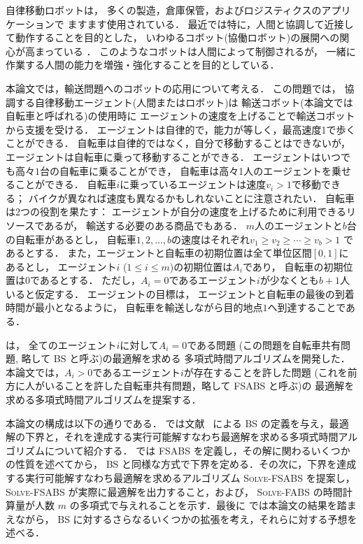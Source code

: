 
自律移動ロボットは，
多くの製造，倉庫保管，およびロジスティクスのアプリケーションで
ますます使用されている．
最近では特に，人間と協調して近接して動作することを目的とした，
いわゆるコボット(協働ロボット)の展開への関心が高まっている \cite{4154820,wiki,6386300}．
このようなコボットは人間によって制御されるが，
一緒に作業する人間の能力を増強・強化することを目的としている．

本論文では，輸送問題へのコボットの応用について考える．
この問題では，
協調する自律移動エージェント(人間またはロボット)は
輸送コボット(本論文では自転車と呼ばれる)の使用時に
エージェントの速度を上げることで輸送コボットから支援を受ける．
エージェントは自律的で，能力が等しく，最高速度1で歩くことができる．
自転車は自律的ではなく，自分で移動することはできないが，
エージェントは自転車に乗って移動することができる．
エージェントはいつでも高々$1$台の自転車に乗ることができ，
自転車は高々1人のエージェントを乗せることができる．
自転車$i$に乗っているエージェントは速度$v_i>1$で移動できる；
バイクが異なれば速度も異なるかもしれないことに注意されたい．
自転車は2つの役割を果たす：
エージェントが自分の速度を上げるために利用できるリソースであるが，
輸送する必要のある商品でもある．
$m$人のエージェントと$b$台の自転車があるとし，
自転車$1,2,\ldots,b$の速度はそれぞれ$v_1\ge v_2\ge\cdots\ge v_b>1$
であるとする．
また，エージェントと自転車の初期位置は全て単位区間$[0,1]$にあるとし，
エージェント$i$ ($1\le i\le m$)の初期位置は$A_i$であり，
自転車の初期位置は$0$であるとする．
ただし，$A_i=0$であるエージェント$i$が少なくとも$b+1$人いると仮定する．
エージェントの目標は，
エージェントと自転車の最後の到着時間が最小となるように，
自転車を輸送しながら目的地点$1$へ到達することである．

\textcite{czyzowicz} は，
全てのエージェント$i$に対して$A_i=0$である問題
(この問題を自転車共有問題, 略して BS と呼ぶ)の最適解を求める
多項式時間アルゴリズムを開発した．
本論文では，$A_i>0$であるエージェント$i$が存在することを許した問題
(これを前方に人がいることを許した自転車共有問題，略して FSABS と呼ぶ)の
最適解を求める多項式時間アルゴリズムを提案する．

本論文の構成は以下の通りである． では文献~\cite{czyzowicz} による BS の定義を与え，最適解の下界と，それを達成する実行可能解すなわち最適解を求める多項式時間アルゴリズムについて紹介する． では FSABS を定義し，その解に関わるいくつかの性質を述べてから， BS と同様な方式で下界を定める．その次に，下界を達成する実行可能解すなわち最適解を求めるアルゴリズム \textsc{Solve-FSABS} を提案し， \textsc{Solve-FSABS} が実際に最適解を出力すること，および， \textsc{Solve-FABS} の時間計算量が人数 $m$ の多項式で与えれることを示す．最後に では本論文の結果を踏まえながら， BS に対するさらなるいくつかの拡張を考え，それらに対する予想を述べる．
